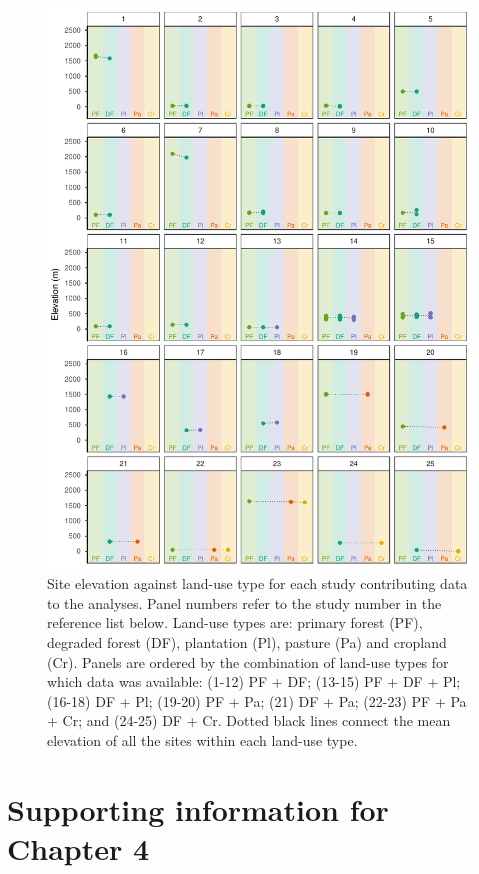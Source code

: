 \documentclass[12pt,a4paper,]{report}
\theoremstyle{definition}
\theoremstyle{definition}
\theoremstyle{definition}
\theoremstyle{remark}
\begin{document}
\begin{figure}[H]

{\centering \includegraphics{./output/fig-A-2-1} 

}

\caption{Site elevation against land-use type for each study
contributing data to the analyses. Panel numbers refer to the study
number in the reference list below. Land-use types are: primary forest
(PF), degraded forest (DF), plantation (Pl), pasture (Pa) and cropland
(Cr). Panels are ordered by the combination of land-use types for which
data was available: (1-12) PF + DF; (13-15) PF + DF + Pl; (16-18) DF +
Pl; (19-20) PF + Pa; (21) DF + Pa; (22-23) PF + Pa + Cr; and (24-25) DF
+ Cr. Dotted black lines connect the mean elevation of all the sites
within each land-use type.}\label{fig:fig-A-2}
\end{figure}

\chapter{Supporting information for Chapter
4}\label{supporting-information-for-chapter-4}
\end{document}
